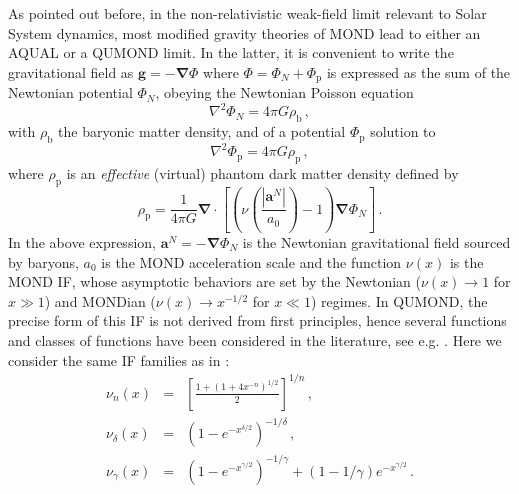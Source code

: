 \documentclass[reprint,nofootinbib,prd,aps]{revtex4-2}
\begin{document}
As pointed out before, in the non-relativistic weak-field limit relevant to Solar System dynamics, most modified gravity theories of MOND lead to either an AQUAL or a QUMOND limit. In the latter, it is convenient to write the gravitational field as $\bm g=-\bm \nabla \Phi$ where $\Phi=\Phi_N + \Phi_\mathrm{p}$ is expressed as the sum of the Newtonian potential $\Phi_N$, obeying the Newtonian Poisson equation
\begin{equation}
    \nabla^2 \Phi_N = 4 \pi G \rho_\mathrm{b} \, ,
\end{equation}
with $\rho_\mathrm{b}$ the baryonic matter density, and of a potential $\Phi_\mathrm{p}$ solution to
\begin{equation}\label{eq:Phi_p}
    \nabla^2 \Phi_\mathrm{p} = 4 \pi G \rho_\mathrm{p} \,,
\end{equation}
where $\rho_\mathrm{p}$ is an \emph{effective} (virtual) phantom dark matter density defined by
\begin{equation}\label{eq:rho_p}
    \rho_\mathrm{p}=\frac{1}{4\pi G}\bm \nabla\cdot \left[\left(\nu\left(\frac{\left|\bm a^N\right|}{a_0}\right)-1\right)\bm \nabla \Phi_N \right] \, .
\end{equation}
 In the above expression, $\bm a^N=-\bm\nabla\Phi_N$ is the Newtonian gravitational field sourced by baryons, $a_0$ is the MOND acceleration scale and the function $\nu(x)$ is the MOND IF, whose asymptotic behaviors are set by the Newtonian ($\nu(x) \rightarrow 1$ for $x \gg 1$) and MONDian ($\nu(x) \rightarrow x^{-1/2}$ for $x \ll 1$) regimes. In QUMOND, the precise form of this IF is not derived from first principles, hence several functions and classes of functions have been considered in the literature, see e.g. \cite{FamaeyMcG,FamaeyDura}. Here we consider the same IF families as in \cite{Desmond_Cassini}:
\begin{subequations}\label{eq:if_fams}
	\begin{eqnarray}
    \nu_n(x)&=&\left[\frac{1+\left(1+4x^{-n}\right)^{1/2}}{2}\right]^{1/n}\, ,  \label{eq:nun}\\
    \nu_\delta(x)&=&\left(1-e^{-x^{\delta/2}}\right)^{-1/\delta}\, , \label{eq:IF_delta}\\
	\nu_\gamma(x)&=&\left(1-e^{-x^{\gamma/2}}\right)^{-1/\gamma}+\left(1-1/\gamma\right) e^{-x^{\gamma/2}} \, . \label{eq:IF_gamma}
	\end{eqnarray}
\end{subequations}
\end{document}
